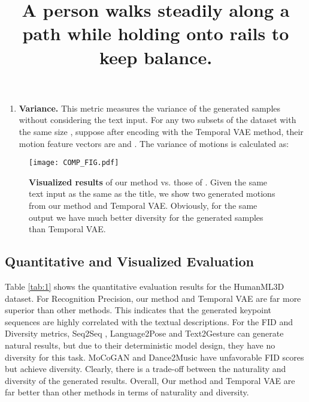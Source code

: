 \documentclass{article}
\begin{document}
\begin{enumerate}
\begin{table*}[ht!]
\begin{tabular}{|c c c c c c c|}
  \end{tabular}
  \caption{Quantitative evaluation results on the HumanML3D test set. R Precision(Top-) is short for Recognition Precision with Top- accuracy.  means the larger value the better performance;  means the smaller value the better performance; means the closer to Real motions the better performance.}
  \label{tab:1}
\end{table*}
  \item \textbf{Variance.} This metric measures the variance of the generated samples without considering the text input. For any two subsets of the dataset with the same size , suppose after encoding with the Temporal VAE method, their motion feature vectors are  and . The variance of motions is calculated as:
  
\end{enumerate} 
\newpage



\begin{figure}[h]
    \centering
    \texttt{[image: COMP\_FIG.pdf]}
    \title{A person \textbf{walks steadily along a path} while\textbf{ holding onto rails} to keep balance.}
    \caption{\textbf{Visualized results} of our method vs. those of \cite{guo2022generating}. Given the same text input as the same as the title, we show two generated motions from our method and Temporal VAE. Obviously, for the same output we have much better diversity for the generated samples than Temporal VAE.}
    \label{fig:2}
    \vspace{-5mm}
\end{figure}





\subsection{Quantitative and Visualized Evaluation}

Table \ref{tab:1} shows the quantitative evaluation results for the HumanML3D dataset. For Recognition Precision, our method and Temporal VAE are far more superior than other methods. This indicates that the generated keypoint sequences are highly correlated with the textual descriptions. For the FID and Diversity metrics, Seq2Seq \cite{linvigil18}, Language2Pose \cite{ahuja2019language2pose} and Text2Gesture \cite{bhattacharya2021text2gestures} can generate natural results, but due to their deterministic model design, they have no diversity for this task. MoCoGAN \cite{tulyakov2018mocogan} and Dance2Music \cite{tang2018dance} have unfavorable FID scores but achieve diversity. Clearly, there is a trade-off between the naturality and diversity of the generated results. Overall, Our method and Temporal VAE are far better than other methods in terms of naturality and diversity.
\end{document}
